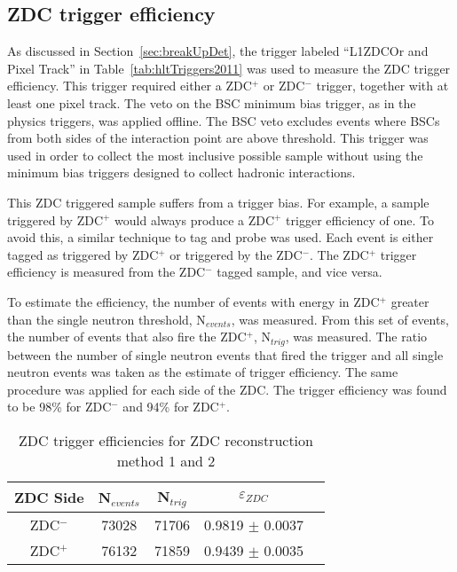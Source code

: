     \subsection{ZDC trigger efficiency}
      As discussed in Section~\ref{sec:breakUpDet}, the trigger labeled 
        ``L1ZDCOr and Pixel Track'' in Table~\ref{tab:hltTriggers2011} was used 
        to measure the ZDC trigger efficiency. 
      This trigger required either a ZDC$^{+}$ or ZDC$^{-}$ trigger, together with at 
        least one pixel track. 
      The veto on the BSC minimum bias trigger, as in the physics triggers, was
        applied offline.
      The BSC veto excludes events where BSCs from both sides of the 
        interaction point are above threshold. 
      This trigger was used in order to collect the most inclusive possible 
        sample without using the minimum bias triggers designed to collect 
        hadronic interactions.

      This ZDC triggered sample suffers from a trigger bias. 
      For example, a sample triggered by ZDC$^{+}$ would always produce a 
        ZDC$^{+}$ trigger efficiency of one. 
      To avoid this, a similar technique to tag and probe was used.
      Each event is either tagged as triggered by ZDC$^{+}$ or triggered 
        by the ZDC$^{-}$. 
      The ZDC$^{+}$ trigger efficiency is measured from the ZDC$^{-}$ tagged 
        sample, and vice versa.

      To estimate the efficiency, the number of events with energy in 
        ZDC$^{+}$ greater than the single neutron threshold, N$_{events}$, 
        was measured.
      From this set of events, the number of events that also fire the 
        ZDC$^{+}$, N$_{trig}$, was measured.
      The ratio between the number of single neutron events that fired the 
        trigger and all single neutron events was taken as the estimate of 
        trigger efficiency. 
      The same procedure was applied for each side of the ZDC.
      The trigger efficiency was found to be 98\% for ZDC$^{-}$
        and 94\% for ZDC$^{+}$.
      \begin{table}
        \centering
        \begin{tabular}{|c|c|c|c|c|}
           \hline ZDC Side & N$_{events}$ & N$_{trig}$ & $\varepsilon_{ZDC}$ \\ \hline
           ZDC$^{-}$ & 73028  & 71706  & 0.9819  $\pm$ 0.0037 \\ \hline
           ZDC$^{+}$ & 76132  & 71859  & 0.9439  $\pm$ 0.0035 \\ \hline
        \end{tabular}
        \caption{ZDC trigger efficiencies for ZDC reconstruction method 1 and 
          2}
        \label{tab:zdcEfficiency}
      \end{table}
